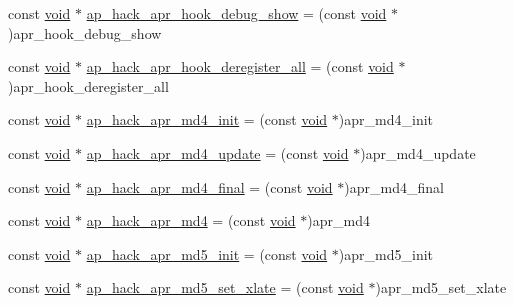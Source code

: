 \begin{DoxyCompactItemize}
\item 
const \hyperlink{group__MOD__ISAPI_gacd6cdbf73df3d9eed42fa493d9b621a6}{void} $\ast$ \hyperlink{srclib_2apr-util_2exports_8c_ae6a2ecdef15f5224692a9d6ccd83aa2e}{ap\+\_\+hack\+\_\+apr\+\_\+hook\+\_\+debug\+\_\+show} = (const \hyperlink{group__MOD__ISAPI_gacd6cdbf73df3d9eed42fa493d9b621a6}{void} $\ast$)apr\+\_\+hook\+\_\+debug\+\_\+show
\item 
const \hyperlink{group__MOD__ISAPI_gacd6cdbf73df3d9eed42fa493d9b621a6}{void} $\ast$ \hyperlink{srclib_2apr-util_2exports_8c_aaf3e645f78e330b16f07bc443fcff189}{ap\+\_\+hack\+\_\+apr\+\_\+hook\+\_\+deregister\+\_\+all} = (const \hyperlink{group__MOD__ISAPI_gacd6cdbf73df3d9eed42fa493d9b621a6}{void} $\ast$)apr\+\_\+hook\+\_\+deregister\+\_\+all
\item 
const \hyperlink{group__MOD__ISAPI_gacd6cdbf73df3d9eed42fa493d9b621a6}{void} $\ast$ \hyperlink{srclib_2apr-util_2exports_8c_a046c9228610b5a0b0335f6561c88da59}{ap\+\_\+hack\+\_\+apr\+\_\+md4\+\_\+init} = (const \hyperlink{group__MOD__ISAPI_gacd6cdbf73df3d9eed42fa493d9b621a6}{void} $\ast$)apr\+\_\+md4\+\_\+init
\item 
const \hyperlink{group__MOD__ISAPI_gacd6cdbf73df3d9eed42fa493d9b621a6}{void} $\ast$ \hyperlink{srclib_2apr-util_2exports_8c_ad2dc21bee7e46cc26f9d0200e59fe632}{ap\+\_\+hack\+\_\+apr\+\_\+md4\+\_\+update} = (const \hyperlink{group__MOD__ISAPI_gacd6cdbf73df3d9eed42fa493d9b621a6}{void} $\ast$)apr\+\_\+md4\+\_\+update
\item 
const \hyperlink{group__MOD__ISAPI_gacd6cdbf73df3d9eed42fa493d9b621a6}{void} $\ast$ \hyperlink{srclib_2apr-util_2exports_8c_aa9ae33d7f869c08dbdce729db2e2f8c4}{ap\+\_\+hack\+\_\+apr\+\_\+md4\+\_\+final} = (const \hyperlink{group__MOD__ISAPI_gacd6cdbf73df3d9eed42fa493d9b621a6}{void} $\ast$)apr\+\_\+md4\+\_\+final
\item 
const \hyperlink{group__MOD__ISAPI_gacd6cdbf73df3d9eed42fa493d9b621a6}{void} $\ast$ \hyperlink{srclib_2apr-util_2exports_8c_a457993af54011522e14cc8ddd326c273}{ap\+\_\+hack\+\_\+apr\+\_\+md4} = (const \hyperlink{group__MOD__ISAPI_gacd6cdbf73df3d9eed42fa493d9b621a6}{void} $\ast$)apr\+\_\+md4
\item 
const \hyperlink{group__MOD__ISAPI_gacd6cdbf73df3d9eed42fa493d9b621a6}{void} $\ast$ \hyperlink{srclib_2apr-util_2exports_8c_ab72d9ad5e1a1948a1613ffb942412bc6}{ap\+\_\+hack\+\_\+apr\+\_\+md5\+\_\+init} = (const \hyperlink{group__MOD__ISAPI_gacd6cdbf73df3d9eed42fa493d9b621a6}{void} $\ast$)apr\+\_\+md5\+\_\+init
\item 
const \hyperlink{group__MOD__ISAPI_gacd6cdbf73df3d9eed42fa493d9b621a6}{void} $\ast$ \hyperlink{srclib_2apr-util_2exports_8c_aa2e90416188109e12e0fca40f58c84e3}{ap\+\_\+hack\+\_\+apr\+\_\+md5\+\_\+set\+\_\+xlate} = (const \hyperlink{group__MOD__ISAPI_gacd6cdbf73df3d9eed42fa493d9b621a6}{void} $\ast$)apr\+\_\+md5\+\_\+set\+\_\+xlate

\end{DoxyCompactItemize}
